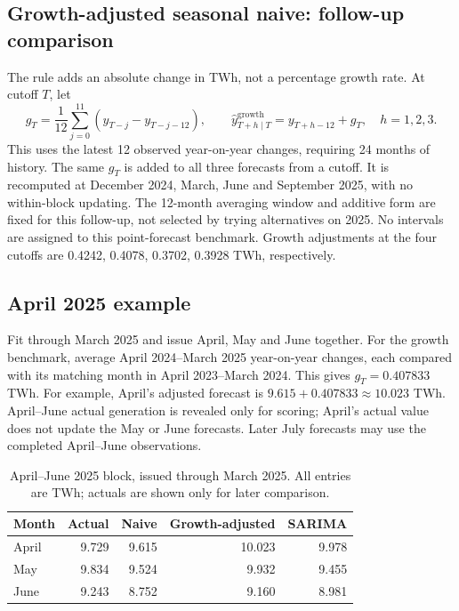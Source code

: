 \documentclass[11pt,a4paper,twoside,reqno]{amsart}
\numberwithin{equation}{section}
\begin{document}
\subsection{Growth-adjusted seasonal naive: follow-up comparison}
The rule adds an absolute change in TWh, not a percentage growth rate. At cutoff $T$, let
\[
g_T=\frac{1}{12}\sum_{j=0}^{11}(y_{T-j}-y_{T-j-12}),
\qquad \widehat y^{\mathrm{growth}}_{T+h\mid T}=y_{T+h-12}+g_T,
\quad h=1,2,3.\tag{3}
\]
This uses the latest 12 observed year-on-year changes, requiring 24 months of history. The same $g_T$ is added to all three forecasts from a cutoff. It is recomputed at December 2024, March, June and September 2025, with no within-block updating. The 12-month averaging window and additive form are fixed for this follow-up, not selected by trying alternatives on 2025. No intervals are assigned to this point-forecast benchmark. Growth adjustments at the four cutoffs are 0.4242, 0.4078, 0.3702, 0.3928 TWh, respectively.

\subsection{April 2025 example}
Fit through March 2025 and issue April, May and June together. For the growth benchmark, average April 2024--March 2025 year-on-year changes, each compared with its matching month in April 2023--March 2024. This gives $g_T=0.407833$ TWh. For example, April's adjusted forecast is $9.615+0.407833\approx10.023$ TWh. April--June actual generation is revealed only for scoring; April's actual value does not update the May or June forecasts. Later July forecasts may use the completed April--June observations.

\begin{table}[htbp]
\centering
\caption{April--June 2025 block, issued through March 2025. All entries are TWh; actuals are shown only for later comparison.}\label{tab:april}
{\fontsize{9.2}{11.3}\selectfont
\begin{tabularx}{\linewidth}{@{}Xrrrr@{}}\toprule
Month & Actual & Naive & Growth-adjusted & SARIMA\\
\midrule
April & 9.729 & 9.615 & 10.023 & 9.978\\
May & 9.834 & 9.524 & 9.932 & 9.455\\
June & 9.243 & 8.752 & 9.160 & 8.981\\
\bottomrule\end{tabularx}
}
\end{table}
\end{document}
